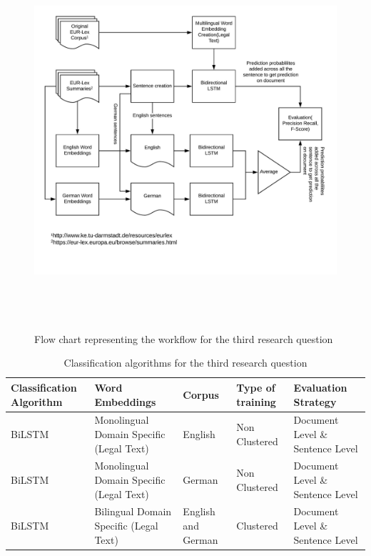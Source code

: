 \begin{figure}[!ht]
    \centering
    \includegraphics[width=15cm, height=14cm,keepaspectratio]{pics/flowforQuestion3.jpeg}
    \caption{Flow chart representing the workflow for the third research question}
    \label{fig:FlowResearchQuestion3}
\end{figure}

\begin{table}[!ht]
\begin{tabular}{>{\centering\arraybackslash}m{2.9cm}>{\centering\arraybackslash}m{2.9cm}>{\centering\arraybackslash}m{2cm}>{\centering\arraybackslash}m{2cm}>{\centering\arraybackslash}m{2.6cm}}
\hline
\textbf{Classification Algorithm} & \textbf{Word Embeddings} & \textbf{Corpus} & \textbf{Type of training} & \textbf{Evaluation Strategy} \\ \hline
\gls{BiLSTM} & Monolingual Domain Specific (Legal Text) & English & Non Clustered & Document Level \&  Sentence Level \\ [0.2cm]
\gls{BiLSTM} & Monolingual Domain Specific (Legal Text) & German & Non Clustered & Document Level \&  Sentence Level \\[0.2cm]

\gls{BiLSTM} & Bilingual Domain Specific (Legal Text) & English and German & Clustered & Document Level \&  Sentence Level \\ \hline
\end{tabular}
\caption{Classification algorithms for the third research question}
\label{table:ListQuestionThirdQuestion}
\end{table}

